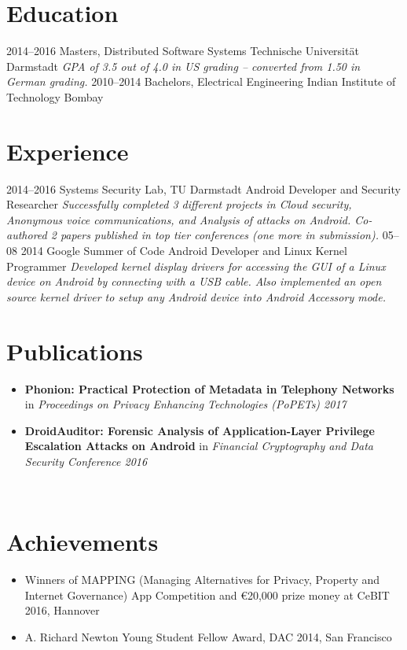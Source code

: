\documentclass[]{friggeri-cv}
\begin{document}
\section{Education}
\begin{entrylist}
  \entry
    {2014–2016}
    {Masters, {\normalfont Distributed Software Systems}}
    {Technische Universität Darmstadt}
    {\emph{GPA of 3.5 out of 4.0 in US grading -- converted from 1.50 in German grading.}}
  \entry
    {2010–2014}
    {Bachelors, {\normalfont Electrical Engineering}}
    {Indian Institute of Technology Bombay}
    {}%
\end{entrylist}

\section{Experience}
\begin{entrylist}
  \entry
    {2014–2016}
    {Systems Security Lab, TU Darmstadt}
    {Android Developer and Security Researcher}
    {\emph{Successfully completed 3 different projects in Cloud security, Anonymous voice communications, and Analysis of attacks on Android. Co-authored 2 papers published in top tier conferences (one more in submission).}}
  \entry
    {05–08 2014}
    {Google Summer of Code}
    {Android Developer and Linux Kernel Programmer}
    {\emph{Developed kernel display drivers for accessing the GUI of a Linux device on Android by connecting with a USB cable. Also implemented an open source kernel driver to setup any Android device into Android Accessory mode.}}
\end{entrylist}

\section{Publications}
\begin{itemize}
  \item \textbf{Phonion: Practical Protection of Metadata in Telephony Networks} in \textit{Proceedings on Privacy Enhancing Technologies (PoPETs) 2017}
  \item \textbf{DroidAuditor: Forensic Analysis of Application-Layer Privilege Escalation Attacks on Android} in \textit{Financial Cryptography and Data Security Conference 2016}
\end{itemize}
~

\section{Achievements}
\begin{itemize}
  \item Winners of MAPPING (Managing Alternatives for Privacy, Property and Internet Governance) App Competition and \euro 20,000 prize money at CeBIT 2016, Hannover
  \item A. Richard Newton Young Student Fellow Award, DAC 2014, San Francisco
\end{itemize}
~
\end{document}
